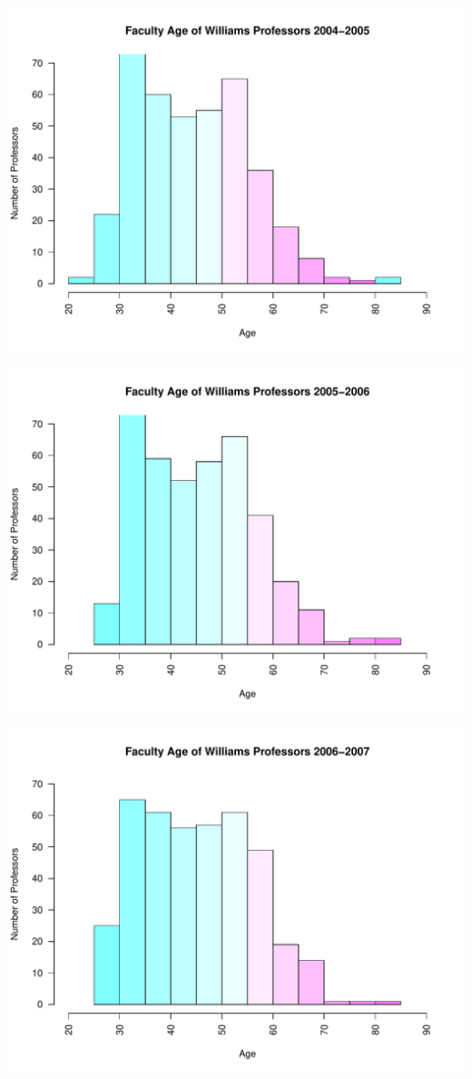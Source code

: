 \documentclass[12pt,a4paper]{article}\usepackage[]{graphicx}\usepackage[]{color}
\makeatletter
\def\maxwidth{ %
  \ifdim\Gin@nat@width>\linewidth
    \linewidth
  \else
    \Gin@nat@width
  \fi
}
\newenvironment{knitrout}{}{} %
\theoremstyle{definition}
\makeatother
\begin{document}
\begin{knitrout}
\color{fgcolor}
\includegraphics[width=\maxwidth]{figure/unnamed-chunk-8-1} 

\includegraphics[width=\maxwidth]{figure/unnamed-chunk-8-2} 

\includegraphics[width=\maxwidth]{figure/unnamed-chunk-8-3} 


\end{knitrout}
\end{document}
